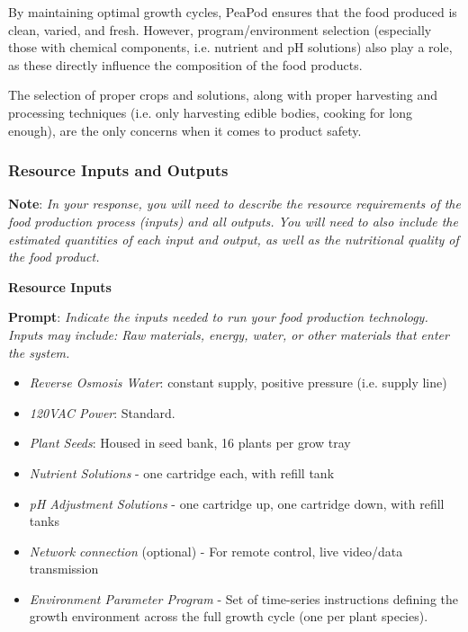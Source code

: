 \documentclass{report}
\begin{document}
By maintaining optimal growth cycles, PeaPod ensures that the food produced is clean, varied, and fresh. However, program/environment selection (especially those with chemical components, i.e. nutrient and pH solutions) also play a role, as these directly influence the composition of the food products.

The selection of proper crops and solutions, along with proper harvesting and processing techniques (i.e. only harvesting edible bodies, cooking for long enough), are the only concerns when it comes to product safety.


\subsubsection{Resource Inputs and Outputs}
\label{sec:resource}

\textbf{Note}: \textit{In your response, you will need to describe the resource requirements of the food production process (inputs) and all outputs. You will need to also include the estimated quantities of each input and output, as well as the nutritional quality of the food product.}

\textbf{Resource Inputs}
\label{sec:resource-inputs}

\textbf{Prompt}: \textit{Indicate the inputs needed to run your food production technology. Inputs may include: Raw materials, energy, water, or other materials that enter the system.}


\begin{itemize}
    \item \textit{Reverse Osmosis Water}: constant supply, positive pressure (i.e. supply line)
    \item \textit{120VAC Power}: Standard.
    \item \textit{Plant Seeds}: Housed in seed bank, 16 plants per grow tray
    \item \textit{Nutrient Solutions} - one cartridge each, with refill tank
    \item \textit{pH Adjustment Solutions} - one cartridge up, one cartridge down, with refill tanks
    \item \textit{Network connection} (optional) - For remote control, live video/data transmission
    \item \textit{Environment Parameter Program} - Set of time-series instructions defining the growth environment across the full growth cycle (one per plant species).
\end{itemize}
\end{document}
